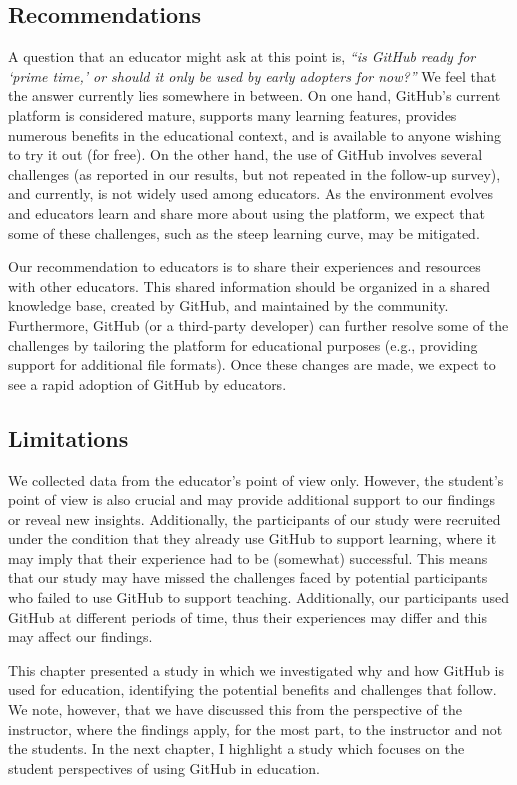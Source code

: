 \subsection{Recommendations}
A question that an educator might ask at this point is, \textit{``is GitHub ready for `prime time,' or should it only be used by early adopters for now?''} We feel that the answer currently lies somewhere in between. On one hand, GitHub's current platform is considered mature, supports many learning features, provides numerous benefits in the educational context, and is available to anyone wishing to try it out (for free). On the other hand, the use of GitHub involves several challenges (as reported in our results, but not repeated in the follow-up survey), and currently, is not widely used among educators. As the environment evolves and educators learn and share more about using the platform, we expect that some of these challenges, such as the steep learning curve, may be mitigated.

Our recommendation to educators is to share their experiences and resources with other educators. This shared information should be organized in a shared knowledge base, created by GitHub, and maintained by the community. Furthermore, GitHub (or a third-party developer) can further resolve some of the challenges by tailoring the platform for educational purposes (e.g., providing support for additional file formats). Once these changes are made, we expect to see a rapid adoption of GitHub by educators.

\subsection{Limitations}
\label{sec:limitations}
We collected data from the educator's point of view only. However, the student's point of view is also crucial and may provide additional support to our findings or reveal new insights. Additionally, the participants of our study were recruited under the condition that they already use GitHub to support learning, where it may imply that their experience had to be (somewhat) successful. This means that our study may have missed the challenges faced by potential participants who failed to use GitHub to support teaching. Additionally, our participants used GitHub at different periods of time, thus their experiences may differ and this may affect our findings.

This chapter presented a study in which we investigated why and how GitHub is used for education, identifying the potential benefits and challenges that follow. We note, however, that we have discussed this from the perspective of the instructor, where the findings apply, for the most part, to the instructor and not the students. In the next chapter, I highlight a study which focuses on the student perspectives of using GitHub in education.
